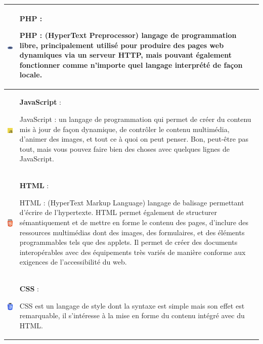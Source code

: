 \documentclass{article}
\begin{document}
            \begin{tabular}{|m{2cm}|m{12cm}|}
                \hline
                \includegraphics[width=2cm]{assets/logos/PHP_logo.png} &
                \textbf{PHP} :
                
                PHP : (HyperText Preprocessor) langage de programmation libre, principalement utilisé pour produire des pages web dynamiques via un serveur HTTP, mais pouvant également fonctionner comme n'importe quel langage interprété de façon locale. \\
                \hline
                \includegraphics[width=2cm]{assets/logos/js.jpg} &
                \textbf{JavaScript} :
                
                JavaScript : un langage de programmation qui permet de créer du contenu mis à jour de façon dynamique, de contrôler le contenu multimédia, d'animer des images, et tout ce à quoi on peut penser. Bon, peut-être pas tout, mais vous pouvez faire bien des choses avec quelques lignes de JavaScript. \\
                \hline
                \includegraphics[width=2cm]{assets/logos/html.jpg} &
                \textbf{HTML} :
                
                HTML : (HyperText Markup Language) langage de balisage permettant d'écrire de l'hypertexte. HTML permet également de structurer sémantiquement et de mettre en forme le contenu des pages, d'inclure des ressources multimédias dont des images, des formulaires, et des éléments programmables tels que des applets. Il permet de créer des documents interopérables avec des équipements très variés de manière conforme aux exigences de l'accessibilité du web. \\
                \hline
                \includegraphics[width=2cm]{assets/logos/css.png} &
                \textbf{CSS} :
                
                CSS est un langage de style dont la syntaxe est simple mais son effet est remarquable, il s'intéresse à la mise en forme du contenu intégré avec du HTML. \\
                \hline
            \end{tabular}
            
\end{document}
